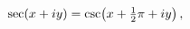 \[\mathop{\sec\/}\nolimits\!\left(x+iy\right)=\mathop{\csc\/}\nolimits\!\left(x+%
\tfrac{1}{2}\pi+iy\right),\]